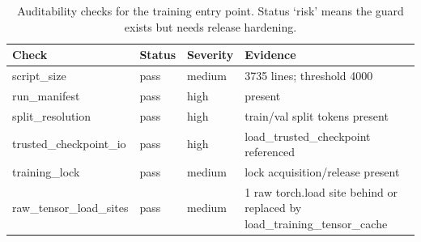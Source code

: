 \begin{table}[t]
\centering
\caption{Auditability checks for the training entry point. Status `risk' means the guard exists but needs release hardening.}
\label{tab:train_feature_field_audit}
\begin{tabular}{llll}
\toprule
Check & Status & Severity & Evidence \\
\midrule
script\_size & pass & medium & 3735 lines; threshold 4000 \\
run\_manifest & pass & high & present \\
split\_resolution & pass & high & train/val split tokens present \\
trusted\_checkpoint\_io & pass & high & load\_trusted\_checkpoint referenced \\
training\_lock & pass & medium & lock acquisition/release present \\
raw\_tensor\_load\_sites & pass & medium & 1 raw torch.load site behind or replaced by load\_training\_tensor\_cache \\
\bottomrule
\end{tabular}
\end{table}
